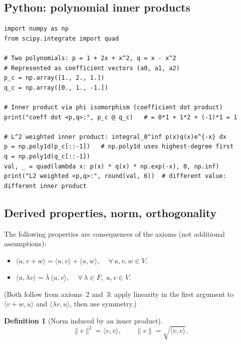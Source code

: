 \documentclass[11pt]{article}
\theoremstyle{definition}
\newtheorem{definition}{Definition}[section]
\theoremstyle{plain}
\begin{document}
\subsection{Python: polynomial inner products}
\begin{lstlisting}
import numpy as np
from scipy.integrate import quad

# Two polynomials: p = 1 + 2x + x^2, q = x - x^2
# Represented as coefficient vectors (a0, a1, a2)
p_c = np.array([1., 2., 1.])
q_c = np.array([0., 1., -1.])

# Inner product via phi isomorphism (coefficient dot product)
print("coeff dot <p,q>:", p_c @ q_c)   # = 0*1 + 1*2 + (-1)*1 = 1

# L^2 weighted inner product: integral_0^inf p(x)q(x)e^{-x} dx
p = np.poly1d(p_c[::-1])   # np.poly1d uses highest-degree first
q = np.poly1d(q_c[::-1])
val, _ = quad(lambda x: p(x) * q(x) * np.exp(-x), 0, np.inf)
print("L2 weighted <p,q>:", round(val, 6))  # different value: different inner product
\end{lstlisting}

\subsection{Derived properties, norm, orthogonality}

The following properties are consequences of the axioms (not additional
assumptions):
\begin{itemize}
  \item[(c)] $\langle u, v+w\rangle = \langle u,v\rangle + \langle u,w\rangle$,
             $\quad\forall\, u,v,w\in V$.
  \item[(d)] $\langle u, \lambda v\rangle = \bar\lambda\,\langle u,v\rangle$,
             $\quad\forall\,\lambda\in F,\; u,v\in V$.
\end{itemize}
(Both follow from axioms~2 and~3: apply linearity in the first argument to
$\langle v+w, u\rangle$ and $\langle \lambda v, u\rangle$, then use symmetry.)

\begin{definition}[Norm induced by an inner product]
  \[
    \|v\|^2 = \langle v, v\rangle, \qquad \|v\| = \sqrt{\langle v, v\rangle}.
  \]
\end{definition}
\end{document}
